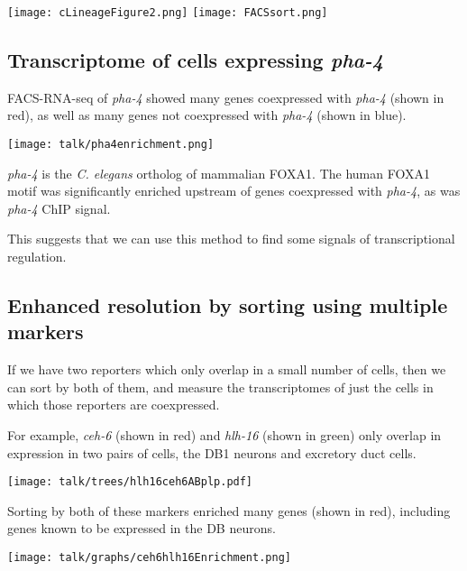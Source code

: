 \documentclass[landscape,a0]{a0poster}
\begin{document}
\begin{multicols}{4}
\begin{center}
\texttt{[image: cLineageFigure2.png]}
\texttt{[image: FACSsort.png]}
\end{center}


\columnbreak

\subsection*{Transcriptome of cells expressing {\em pha-4} }

FACS-RNA-seq of {\em pha-4} showed many genes coexpressed with {\em pha-4} (shown in red),
as well as many genes not coexpressed with {\em pha-4} (shown in blue).

\begin{center}
\texttt{[image: talk/pha4enrichment.png]}
\end{center}

{\em pha-4} is the {\em C. elegans} ortholog of mammalian FOXA1.
The human FOXA1 motif was significantly enriched upstream of genes coexpressed with
{\em pha-4}, as was {\em pha-4} ChIP signal.

This suggests that we can use this method to find some signals of transcriptional regulation.

\subsection*{Enhanced resolution by sorting using multiple markers}

If we have two reporters which only overlap in a small number of cells, then we
can sort by both of them, and measure the transcriptomes of just the cells in
which those reporters are coexpressed.

For example, {\em ceh-6} (shown in red) and {\em hlh-16} (shown in green)
only overlap in expression in two pairs of cells,
the DB1 neurons and excretory duct cells.

\begin{center}
\texttt{[image: talk/trees/hlh16ceh6ABplp.pdf]}
\end{center}

Sorting by both of these markers enriched many genes (shown in red), including genes
known to be expressed in the DB neurons.

\begin{center}
\texttt{[image: talk/graphs/ceh6hlh16Enrichment.png]}
\end{center}


\end{multicols}
\end{document}
